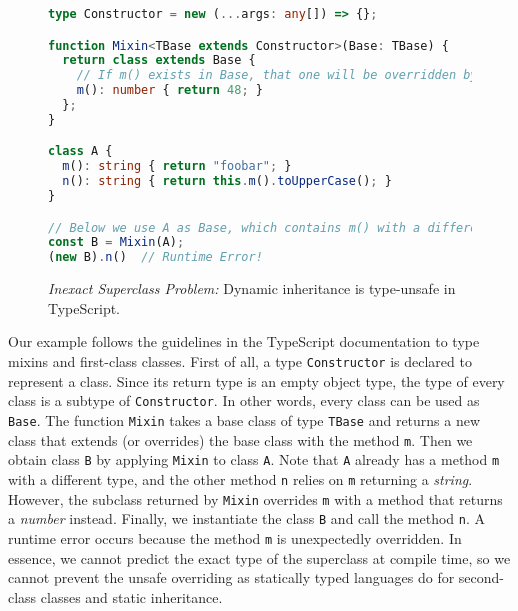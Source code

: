 \begin{figure}
\begin{lstlisting}[language=TypeScript]
type Constructor = new (...args: any[]) => {};

function Mixin<TBase extends Constructor>(Base: TBase) {
  return class extends Base {
    // If m() exists in Base, that one will be overridden by this definition.
    m(): number { return 48; }
  };
}

class A {
  m(): string { return "foobar"; }
  n(): string { return this.m().toUpperCase(); }
}

// Below we use A as Base, which contains m() with a different type.
const B = Mixin(A);
(new B).n()  // Runtime Error!
\end{lstlisting}
\caption{\emph{Inexact Superclass Problem:} Dynamic inheritance is type-unsafe in TypeScript.} \label{fig:dynamic}
\end{figure}

Our example follows the guidelines in the TypeScript documentation to type
mixins and first-class classes. First of all, a type \lstinline{Constructor} is
declared to represent a class. Since its return type is an empty object type,
the type of every class is a subtype of \lstinline{Constructor}. In other words,
every class can be used as \lstinline{Base}. The function \lstinline{Mixin}
takes a base class of type \lstinline{TBase} and returns a new class that
extends (or overrides) the base class with the method \lstinline{m}. Then we
obtain class \lstinline{B} by applying \lstinline{Mixin} to class \lstinline{A}.
Note that \lstinline{A} already has a method \lstinline{m} with a different
type, and the other method \lstinline{n} relies on \lstinline{m} returning a
\emph{string}. However, the subclass returned by \lstinline{Mixin} overrides
\lstinline{m} with a method that returns a \emph{number} instead. Finally, we
instantiate the class \lstinline{B} and call the method \lstinline{n}. A runtime
error occurs because the method \lstinline{m} is unexpectedly overridden. In
essence, we cannot predict the exact type of the superclass at compile time, so
we cannot prevent the unsafe overriding as statically typed languages do for
second-class classes and static inheritance.

